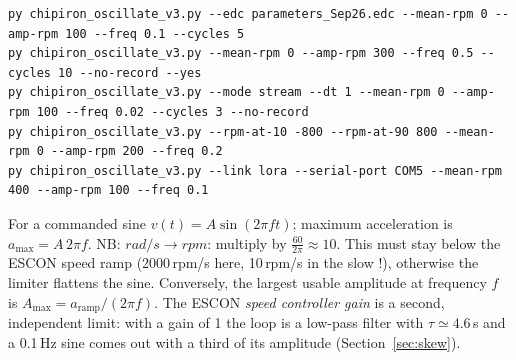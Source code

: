 \documentclass[a4paper,11pt]{article}
\newcommand{\code}[1]{\texttt{\detokenize{#1}}}
\begin{document}
\begin{lstlisting}[title={Terminal (VS Code): oscillation examples}]
py chipiron_oscillate_v3.py --edc parameters_Sep26.edc --mean-rpm 0 --amp-rpm 100 --freq 0.1 --cycles 5
py chipiron_oscillate_v3.py --mean-rpm 0 --amp-rpm 300 --freq 0.5 --cycles 10 --no-record --yes
py chipiron_oscillate_v3.py --mode stream --dt 1 --mean-rpm 0 --amp-rpm 100 --freq 0.02 --cycles 3 --no-record
py chipiron_oscillate_v3.py --rpm-at-10 -800 --rpm-at-90 800 --mean-rpm 0 --amp-rpm 200 --freq 0.2
py chipiron_oscillate_v3.py --link lora --serial-port COM5 --mean-rpm 400 --amp-rpm 100 --freq 0.1
\end{lstlisting}



\begin{notebox}
For a commanded sine $v(t)=A\sin(2\pi f t)$; maximum acceleration is $a_{\max}=A\,2\pi f$. NB: $rad/s \to rpm $: multiply by $\frac{60}{2\pi} \approx 10$.
This must stay below the ESCON speed ramp (2000\,rpm/s here, 10\,rpm/s in the slow \code{.edc}!), otherwise the limiter flattens the sine. Conversely, the largest usable amplitude at frequency $f$ is $A_{\max}=a_{\mathrm{ramp}}/(2\pi f)$. The ESCON \emph{speed controller gain} is a second, independent limit: with a gain of 1 the loop is a low-pass filter with $\tau\simeq4.6$\,s and a 0.1\,Hz sine comes out with a third of its amplitude (Section~\ref{sec:skew}).
\end{notebox}
\end{document}
